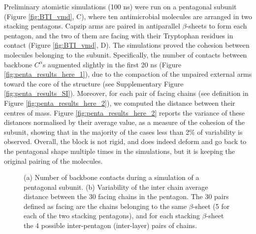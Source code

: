 Preliminary atomistic simulations (100 ns) were run on a pentagonal subunit (Figure \ref{fig:BTI_vmd}, C), where ten antimicrobial molecules are arranged in two stacking pentagons. Capzip arms are paired in antiparallel $\beta$-sheets to form each pentagon, and the two of them are facing with their Tryptophan residues in contact (Figure \ref{fig:BTI_vmd}, D).
%
The simulations proved the cohesion between molecules belonging to the subunit. Specifically, the number of contacts between backbone $C^\alpha$s augmented slightly in the first 20 ns (Figure \ref{fig:penta_results_here_1}), due to the compaction of the unpaired external arms toward the core of the structure (see Supplementary Figure \ref{fig:penta_results_SI}).
%
Moreover, for each pair of facing chains (see definition in Figure \ref{fig:penta_results_here_2}), we computed the distance between their centres of mass. Figure \ref{fig:penta_results_here_2} reports the variance of these distances normalised by their average value, as a measure of the cohesion of the subunit, showing that in the majority of the cases less than 2\% of variability is observed. Overall, the block is not rigid, and does indeed deform and go back to the pentagonal shape multiple times in the simulations, but it is keeping the original pairing of the molecules.
\begin{figure}[t!]
\centering
{}
\caption[Cohesion measures on the pentagonal subunit]{(a) Number of backbone contacts during a simulation of a pentagonal subunit. (b) Variability of the inter chain average distance between the 30 facing chains in the pentagon. The 30 pairs defined as facing are the chains belonging to the same $\beta$-sheet (5 for each of the two stacking pentagons), and for each stacking $\beta$-sheet the 4 possible inter-pentagon (inter-layer) pairs of chains.}
\label{fig:penta_results_here}
\end{figure}

